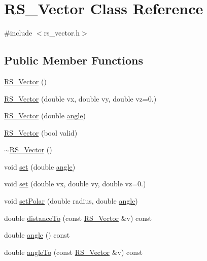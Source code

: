 \hypertarget{classRS__Vector}{\section{R\-S\-\_\-\-Vector Class Reference}
\label{classRS__Vector}
}


{\ttfamily \#include $<$rs\-\_\-vector.\-h$>$}

\subsection*{Public Member Functions}
\begin{DoxyCompactItemize}
\item 
\hyperlink{classRS__Vector_aeb0f0df770b60e94c8ab65304749943f}{R\-S\-\_\-\-Vector} ()
\item 
\hyperlink{classRS__Vector_a48ba2b83dc071d8c779d2e3d3ae6b3a2}{R\-S\-\_\-\-Vector} (double vx, double vy, double vz=0.)
\item 
\hyperlink{classRS__Vector_a6aba6a35bd9cbc18a9c0375a7e02c4f1}{R\-S\-\_\-\-Vector} (double \hyperlink{classRS__Vector_a7fd6801a576580f279353d0fd9d40313}{angle})
\item 
\hyperlink{classRS__Vector_a0bc31448ae9fc7f5e8ab41a86fe41e89}{R\-S\-\_\-\-Vector} (bool valid)
\item 
\hyperlink{classRS__Vector_ac84e1fb6316457064342312fe232caa7}{$\sim$\-R\-S\-\_\-\-Vector} ()
\item 
void \hyperlink{classRS__Vector_a9c5a71f939e7e8d4b675b47f92686a9a}{set} (double \hyperlink{classRS__Vector_a7fd6801a576580f279353d0fd9d40313}{angle})
\item 
void \hyperlink{classRS__Vector_ab83aa1475e39334092f1fe5043905787}{set} (double vx, double vy, double vz=0.)
\item 
void \hyperlink{classRS__Vector_a97ca1b03bb2c3738cec5b86575ef6bf5}{set\-Polar} (double radius, double \hyperlink{classRS__Vector_a7fd6801a576580f279353d0fd9d40313}{angle})
\item 
double \hyperlink{classRS__Vector_ac6e5c85479562f7affae3084db96b155}{distance\-To} (const \hyperlink{classRS__Vector}{R\-S\-\_\-\-Vector} \&v) const 
\item 
double \hyperlink{classRS__Vector_a7fd6801a576580f279353d0fd9d40313}{angle} () const 
\item 
double \hyperlink{classRS__Vector_adc2b3700e0310cd24e38824d890979f1}{angle\-To} (const \hyperlink{classRS__Vector}{R\-S\-\_\-\-Vector} \&v) const 
\item 

\end{DoxyCompactItemize}
